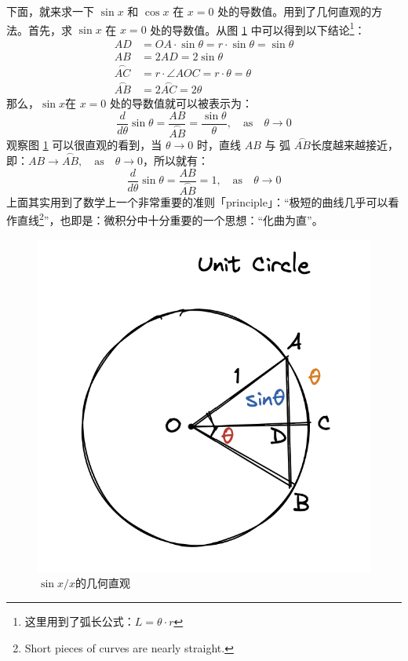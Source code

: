 \documentclass{ctexart}
\numberwithin{equation}{section}
\numberwithin{figure}{section}
\begin{document}
下面，就来求一下 \(\sin x\) 和 \(\cos x\) 在 \(x = 0\) 处的导数值。用到了几何直观的方法。首先，求 \(\sin x\)
在 \(x = 0\) 处的导数值。从图 \ref{fig:sinx/x} 中可以得到以下结论\footnote{这里用到了弧长公式：\(L = \theta \cdot r\)}：
\begin{align*}
    AD                   & = OA\cdot \sin \theta = r \cdot \sin \theta = \sin \theta \\
    AB                   & = 2AD = 2 \sin \theta                                     \\
    \overset{\frown}{AC} & = r \cdot \angle AOC = r \cdot \theta = \theta            \\
    \overset{\frown}{AB} & = 2\overset{\frown}{AC} = 2\theta
\end{align*}
那么，\(\sin x\)在 \(x = 0\) 处的导数值就可以被表示为：
\begin{equation*}
    \frac{d}{d\theta}\sin\theta = \frac{AB}{\overset{\frown}{AB}} = \frac{\sin\theta}{\theta}, \quad \text{as} \quad \theta \to 0
\end{equation*}
观察图 \ref{fig:sinx/x} 可以很直观的看到，当 \( \theta \to 0 \) 时，直线 \( AB \) 与 弧 \(\overset{\frown}{AB}\)长度越来越接近，即：\( AB \to \overset{\frown}{AB}, \quad \text{as} \quad \theta \to 0 \)，所以就有：
\begin{equation}\label{eq:DerivativeofSineatx=0}
    \frac{d}{d\theta}\sin\theta = \frac{AB}{\overset{\frown}{AB}} = 1, \quad \text{as} \quad \theta \to 0
\end{equation}
上面其实用到了数学上一个非常重要的准则「principle」：“极短的曲线几乎可以看作直线\footnote{Short pieces of curves are nearly straight.}”，也即是：微积分中十分重要的一个思想：“化曲为直”。
\begin{figure}[H]
    \centering
    \includegraphics[scale=0.5]{images/circle_sinx.png}
    \caption{\(\sin x/ x\)的几何直观}\label{fig:sinx/x}
\end{figure}
\end{document}
